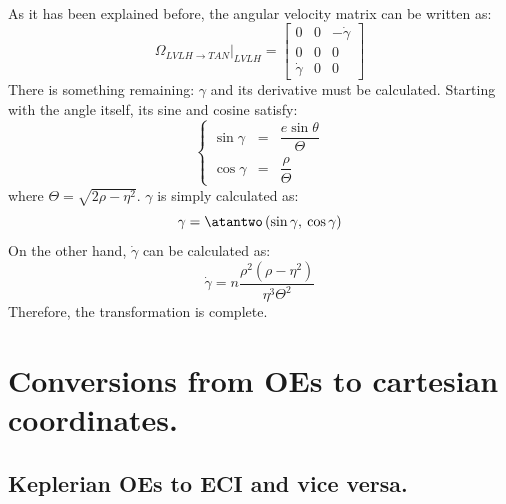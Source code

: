 			\paragraph{  \\}
			\indent As it has been explained before, the angular velocity matrix can be written as:
			\[
			\Omega_{LVLH\to TAN}\rvert_{LVLH} = \left[ \begin{array}{ccc}
			0 			& 0	& -\dot{\gamma}\\
			0 			& 0 & 0 \\
			\dot{\gamma}& 0 & 0
			\end{array}\right]
			\] 
			\indent There is something remaining: $\gamma$ and its derivative must be calculated. Starting with the angle itself, its sine and cosine satisfy:
			\[
			\left\{
			\begin{array}{ccc}
			\sin\gamma & = & \dfrac{e \sin \theta}{\Theta} \\[1.2em]
			\cos\gamma & = & \dfrac{\rho}{\Theta}
			\end{array}
			\right.
			\]
			\noindent where $\Theta = \sqrt{2 \rho - \eta^2}$. $\gamma$ is simply calculated as:
			\[\gamma = \atantwo\left(\sin\gamma ,\: \cos\gamma\right)\]
			\indent On the other hand, $\dot{\gamma}$ can be calculated as:
			\[
			\dot{\gamma} = n \dfrac{\rho^2 \left( \rho - \eta^2\right)}{\eta^3 \Theta^2}
			\]
			\indent Therefore, the transformation is complete.
\section{Conversions from OEs to cartesian coordinates.}
%
%
	\subsection{Keplerian OEs to ECI and vice versa.}
